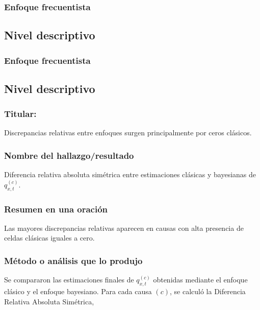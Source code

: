 \documentclass[
  spanish,
  letterpaper,
  DIV=11,
  numbers=noendperiod]{scrartcl}
\begin{document}
\subsubsection{Enfoque frecuentista}\label{enfoque-frecuentista}

\subsection{Nivel descriptivo}\label{nivel-descriptivo}

\subsubsection{Enfoque frecuentista}\label{enfoque-frecuentista-1}

\subsection{Nivel descriptivo}\label{nivel-descriptivo-1}

\subsubsection{Titular:}\label{titular}

Discrepancias relativas entre enfoques surgen principalmente por ceros
clásicos.

\subsubsection{Nombre del
hallazgo/resultado}\label{nombre-del-hallazgoresultado}

Diferencia relativa absoluta simétrica entre estimaciones clásicas y
bayesianas de \(q_{x,t}^{(c)}\).

\subsubsection{Resumen en una oración}\label{resumen-en-una-oraciuxf3n}

Las mayores discrepancias relativas aparecen en causas con alta
presencia de celdas clásicas iguales a cero.

\subsubsection{Método o análisis que lo
produjo}\label{muxe9todo-o-anuxe1lisis-que-lo-produjo}

Se compararon las estimaciones finales de \(q_{x,t}^{(c)}\) obtenidas
mediante el enfoque clásico y el enfoque bayesiano. Para cada causa
\((c)\), se calculó la Diferencia Relativa Absoluta Simétrica,
\end{document}
